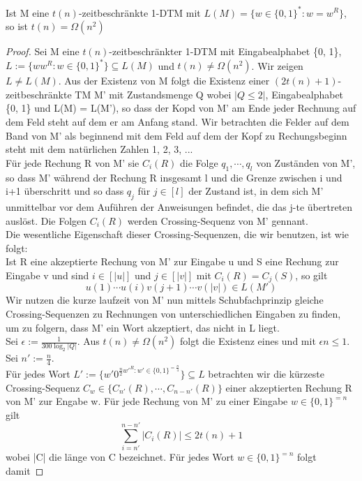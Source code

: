     Ist M eine \(t(n)\)-zeitbeschränkte 1-DTM mit \(L(M) = \{w \in \{0, 1\}^* : w = w^R\}\), so ist \(t(n) = \Omega (n^2)\)
    \begin{proof}
        Sei M eine \(t(n)\)-zeitbeschränkter 1-DTM mit Eingabealphabet \{0, 1\}, \(L := \{ww^R : w \in \{0, 1\}^*\} \subseteq L(M)\) und \(t(n) \not = \Omega (n^2)\). Wir zeigen \(L \not = L(M)\). Aus der Existenz von M folgt die Existenz einer \((2t(n) + 1)\)-zeitbeschränkte TM M' mit Zustandsmenge Q wobei \(|Q \leq 2|\), Eingabealphabet \{0, 1\} und L(M) = L(M'), so dass der Kopd von M' am Ende jeder Rechnung auf dem Feld steht auf dem er am Anfang stand. Wir betrachten die Felder auf dem Band von M' als beginnend mit dem Feld auf dem der Kopf zu Rechungsbeginn steht mit dem natürlichen Zahlen 1, 2, 3, ...\\ Für jede Rechung R von M' sie \(C_i (R)\) die Folge \(q_1, \cdots, q_l\) von Zuständen von M', so dass M' während der Rechung R insgesamt l und die Grenze zwischen i und i+1 überschritt und so dass \(q_j\) für \(j \in [l]\) der Zustand ist, in dem sich M' unmittelbar vor dem Auführen der Anweisungen befindet, die das j-te übertreten auslöst. Die Folgen \(C_i(R)\) werden Crossing-Sequenz von M' gennant.\\ Die wesentliche Eigenschaft dieser Crossing-Sequenzen, die wir benutzen, ist wie folgt:\\ Ist R eine akzeptierte Rechung von M' zur Eingabe u und S eine Rechung zur Eingabe v und sind \(i \in [|u|]\) und \(j \in [|v|]\) mit \(C_i(R) = C_j(S)\), so gilt 
        \[
            u(1) \cdots u(i) v(j+1) \cdots v(|v|) \in L(M')   
        \]
        Wir nutzen die kurze laufzeit von M' nun mittels Schubfachprinzip gleiche Crossing-Sequenzen zu Rechnungen von unterschiedlichen Eingaben zu finden, um zu folgern, dass M' ein Wort akzeptiert, das nicht in L liegt. \\ Sei \(\epsilon := \frac{1}{300 \log_2 |Q|}\). Aus \(t(n) \not = \Omega(n^2)\) folgt die Existenz eines und mit \(\epsilon n \leq 1\). Sei \(n' := \frac{n}{4}\).\\ Für jedes Wort \(L' := \{w' 0^{\frac{n}{2} w'^R : w' \in \{0, 1\}^{=\frac{n}{4}}}\} \subseteq L\) betrachten wir die kürzeste Crossing-Sequenz \(C_w \in \{C_{n'}(R), \cdots, C_{n-n'}(R)\}\) einer akzeptierten Rechung R von M' zur Engabe w. Für jede Rechung von M' zu einer Eingabe \(w \in \{0, 1\}^{= n}\) gilt 
        \[
            \sum\limits_{i=n'}^{n-n'}|C_i(R)| \leq 2t(n)+1
        \]
        wobei |C| die länge von C bezeichnet. Für jedes Wort \(w \in \{0, 1\}^{=n}\) folgt damit 

\end{proof}

